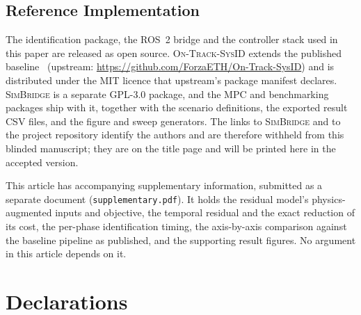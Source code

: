 \documentclass[lineno,12pt]{sn-jnl}
\newcommand{\bridge}{\textsc{SimBridge}}
\newcommand{\sysid}{\textsc{On-Track-SysID}}
\theoremstyle{thmstyleone}%
\theoremstyle{thmstyletwo}%
\theoremstyle{thmstylethree}%
\begin{document}
\begin{appendices}
\section{Reference Implementation}
\label{sec:refimpl}

The identification package, the ROS~2 bridge and the controller stack used in
this paper are released as open source. \sysid{} extends the published
baseline~\cite{ontrack2025} (upstream:
\url{https://github.com/ForzaETH/On-Track-SysID}) and is distributed under the
MIT licence that upstream's package manifest declares. \bridge{} is a separate
GPL-3.0 package, and the MPC and benchmarking packages ship with it, together
with the scenario definitions, the exported result CSV files, and the figure
and sweep generators. The links to \bridge{} and to the project repository
identify the authors and are therefore withheld from this blinded manuscript;
they are on the title page and will be printed here in the accepted version.

\end{appendices}

\backmatter


This article has accompanying supplementary information, submitted as a
separate document (\texttt{supplementary.pdf}). It holds the residual model's
physics-augmented inputs and objective, the temporal residual and the exact
reduction of its cost, the per-phase identification timing, the axis-by-axis
comparison against the baseline pipeline as published, and the supporting
result figures. No argument in this article depends on it.

\section*{Declarations}
\end{document}
